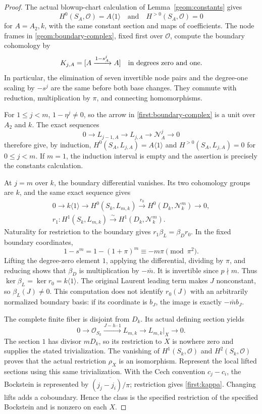 \begin{proof}
The actual blowup-chart calculation of Lemma~\ref{geom:constants} gives
\[
H^0(S_A,\mathcal O)=A\langle1\rangle
\quad\text{and}\quad H^{>0}(S_A,\mathcal O)=0
\]
for $A=A_2,k$, with the same constant section and maps of coefficients.
The node frames in \eqref{geom:boundary-complex}, fixed first over
$\mathcal O$, compute the boundary cohomology by
\begin{equation}
 K_{j,A}=[A\xrightarrow{1-s_A^j}A]
 \quad\hbox{in degrees zero and one}.
 \label{first:boundary-complex}
\end{equation}
In particular, the elimination of seven invertible node pairs and the
degree-one scaling by $-s^j$ are the same before both base changes.
They commute with reduction, multiplication by $\pi$, and connecting
homomorphisms.

For $1\le j<m$, $1-\eta^j\ne0$, so the arrow in
\eqref{first:boundary-complex} is a unit over $A_2$ and $k$.
The exact sequences
\[
 0\longrightarrow L_{j-1,A}\longrightarrow L_{j,A}
 \longrightarrow\mathcal N_A^j\longrightarrow0
\]
therefore give, by induction,
$H^0(S_A,L_{j,A})=A\langle1\rangle$ and $H^{>0}(S_A,L_{j,A})=0$
for $0\le j<m$. If $m=1$, the induction interval is empty and the
assertion is precisely the constants calculation.

At $j=m$ over $k$, the boundary differential vanishes. Its two
cohomology groups are $k$, and the same exact sequence gives
\[
 \begin{gathered}
 0\longrightarrow k\langle1\rangle\longrightarrow H^0(S_k,L_{m,k})
 \xrightarrow{r_0}H^0(D_k,\mathcal N_k^m)\longrightarrow0,\\
 r_1:H^1(S_k,L_{m,k})\xrightarrow{\sim}H^1(D_k,\mathcal N_k^m).
 \end{gathered}
\]
Naturality for restriction to the boundary gives
$r_1\beta_L=\beta_Dr_0$. In the fixed boundary coordinates,
\[
 1-s^m=1-(1+\pi)^m\equiv-m\pi\pmod{\pi^2}.
\]
Lifting the degree-zero element $1$, applying the differential, dividing
by $\pi$, and reducing shows that $\beta_D$ is multiplication by
$-\bar m$. It is invertible since $p\nmid m$. Thus
$\ker\beta_L=\ker r_0=k\langle1\rangle$. The original Laurent leading
term makes $J$ nonconstant, so $\beta_L(J)\ne0$. This computation does
not identify $r_0(J)$ with an arbitrarily normalized boundary basis:
if its coordinate is $b_J$, the image is exactly $-\bar m b_J$.

The complete finite fiber is disjoint from $D_k$. Its actual defining
section yields
\[
 0\longrightarrow\mathcal O_{S_k}
 \xrightarrow{J-h\cdot1}L_{m,k}
 \longrightarrow L_{m,k}|_X\longrightarrow0.
\]
The section $1$ has divisor $mD_k$, so its restriction to $X$ is
nowhere zero and supplies the stated trivialization. The vanishing of
$H^1(S_k,\mathcal O)$ and $H^2(S_k,\mathcal O)$ proves that the actual
restriction $\rho_X$ is an isomorphism. Represent the local lifted
sections using this same trivialization. With the Cech convention
$c_j-c_i$, the Bockstein is represented by
$\overline{(j_j-j_i)/\pi}$; restriction gives \eqref{first:kappa}.
Changing lifts adds a coboundary. Hence the class is the specified
restriction of the specified Bockstein and is nonzero on each $X$.
\end{proof}

